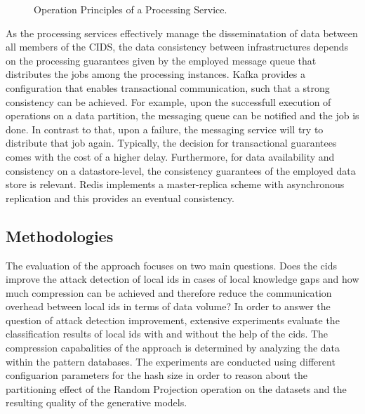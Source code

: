 \documentclass[../../main.tex]{subfiles}
\begin{document}
\begin{figure}[b!]
    \centering
    
    \caption[Operation principles of a processing service]{Operation Principles of a Processing Service.}  \label{fig:implementation}
 \end{figure}

As the processing services effectively manage the disseminatation of data between all members of the CIDS, the data consistency between infrastructures depends on the processing guarantees given by the employed message queue that distributes the jobs among the processing instances. Kafka provides a configuration that enables transactional communication, such that a strong consistency can be achieved. For example, upon the successfull execution of operations on a data partition, the messaging queue can be notified and the job is done. In contrast to that, upon a failure, the messaging service will try to distribute that job again. Typically, the decision for transactional guarantees comes with the cost of a higher delay. Furthermore, for data availability and consistency on a datastore-level, the consistency guarantees of the employed data store is relevant. Redis implements a master-replica scheme with asynchronous replication and this provides an eventual consistency.

\subsection{Methodologies}\label{subsec:methodologies}

The evaluation of the approach focuses on two main questions. Does the \gls{cids} improve the attack detection of local \gls{ids} in cases of local knowledge gaps and how much compression can be achieved and therefore reduce the communication overhead between local \gls{ids} in terms of data volume? In order to answer the question of attack detection improvement, extensive experiments evaluate the classification results of local \gls{ids} with and without the help of the \gls{cids}. The compression capabalities of the approach is determined by analyzing the data within the pattern databases. The experiments are conducted using different configuarion parameters for the hash size in order to reason about the partitioning effect of the Random Projection operation on the datasets and the resulting quality of the generative models.
\end{document}
